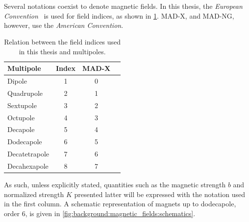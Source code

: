 \section{}

\subsection{}

Several notations coexist to denote magnetic fields. In this thesis, the
\textit{European Convention}~\cite{dilly_corrections_2022} is used for field indices, as shown
in \cref{tab:magnetic_fields:relation_indices}. MAD-X, and MAD-NG, however, use the
\textit{American Convention}. 

\begin{table}[H]
    \centering
    \begin{tabular}{lccc}
    \toprule
        Multipole     &     Index         &      MAD-X      \\
    \midrule                              
        Dipole        &     1             &     0           \\
        Quadrupole    &     2             &     1           \\
        Sextupole     &     3             &     2           \\
        Octupole      &     4             &     3           \\
        Decapole      &     5             &     4           \\
        Dodecapole    &     6             &     5           \\
        Decatetrapole &     7             &     6           \\
        Decahexapole  &     8             &     7           \\
    \bottomrule
    \end{tabular}
    \caption{Relation between the field indices used in this thesis and multipoles.}
    \label{tab:magnetic_fields:relation_indices}
  \end{table}

As such, unless explicitly stated, quantities such as the magnetic strength $b$ and normalized
strength $K$ presented latter will be expressed with the notation used in the first column. 
A schematic representation of magnets up to dodecapole, order 6, is given in
\cref{fig:background:magnetic_fields:schematics}.

